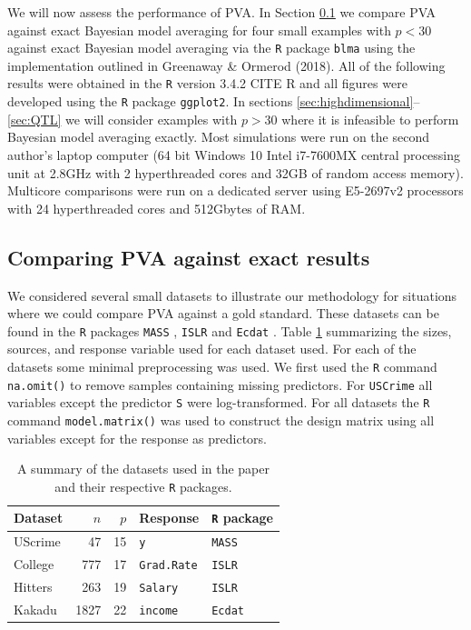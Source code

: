 We will now assess the performance of PVA. In Section \ref{sec:exact} we compare PVA 
against exact
Bayesian model averaging for four small examples with $p<30$ against exact Bayesian
model averaging via the {\tt R} package {\tt blma} using the implementation outlined 
in Greenaway \& Ormerod (2018). All of the following results were obtained in the 
{\tt R} version 3.4.2 CITE R and all figures were developed using the {\tt R} 
package {\tt ggplot2}.
In sections \ref{sec:highdimensional}--\ref{sec:QTL}
we will consider examples with $p>30$ where
it is infeasible to perform Bayesian model averaging exactly. 
Most simulations were run on the second author's laptop computer (64 bit Windows 10 Intel
i7-7600MX central processing unit at 2.8GHz with 2 hyperthreaded cores and 32GB of random access memory). 
Multicore comparisons were run on a dedicated server using E5-2697v2 processors
with 24 hyperthreaded cores and 512Gbytes of RAM.

\subsection{Comparing PVA against exact results} 
\label{sec:exact}

We considered several small datasets to illustrate our methodology for situations where
we could compare PVA against a gold standard. These datasets
can be found in the {\tt R} packages {\tt MASS} \citep{Venables2002},  {\tt ISLR} \cite{James:2014:ISL:2517747}
and {\tt Ecdat} \citep{Croissant2016}. Table \ref{tab:datasets} summarizing the sizes,  
sources, and response variable used for each dataset used.   For each of the datasets some minimal preprocessing was used.
We first used the {\tt R} command {\tt na.omit()} to remove samples containing missing predictors. 
For {\tt USCrime} all variables except the predictor {\tt S} were log-transformed. For all datasets
the {\tt R} command {\tt model.matrix()} was used to construct the design matrix using all 
variables except for the response as predictors.

\begin{table}[ht!]
	\begin{center}
		\begin{tabular}{l|r|r|l|l}
			Dataset	& $n$ & $p$ & Response & {\tt R} package \\ 
			\hline 
			UScrime 	& 47 & 15 &  {\tt y} & {\tt MASS} \\  
			College &  777   & 17      &  {\tt Grad.Rate}      & {\tt ISLR} \\ 
			Hitters	& 263 & 19 & {\tt Salary} & {\tt ISLR} \\ 
			Kakadu	& 1827 & 22 & {\tt income} & {\tt Ecdat}   \\  
		\end{tabular} 
	\end{center}
	\caption{A summary of the datasets used in the paper and their respective {\tt R} packages.}
	\label{tab:datasets}
\end{table}

